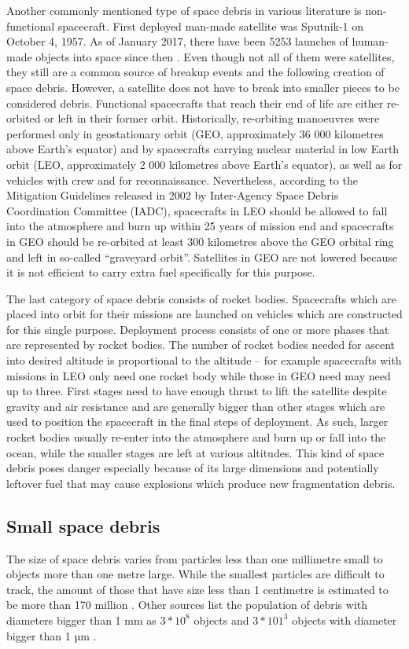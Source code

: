 	Another commonly mentioned type of space debris in various literature is non-functional spacecraft. First deployed man-made satellite was Sputnik-1 on October 4, 1957. As of January 2017, there have been 5253 launches of human-made objects into space since then \citep{esabr336}. Even though not all of them were satellites, they still are a common source of breakup events and the following creation of space debris. However, a satellite does not have to break into smaller pieces to be considered debris. Functional spacecrafts that reach their end of life are either re-orbited or left in their former orbit. Historically, re-orbiting manoeuvres were performed only in geostationary orbit (GEO, approximately 36 000 kilometres above Earth's equator) and by spacecrafts carrying nuclear material in low Earth orbit (LEO, approximately 2 000 kilometres above Earth's equator), as well as for vehicles with crew and for reconnaissance. Nevertheless, according to the Mitigation Guidelines released in 2002 by Inter-Agency Space Debris Coordination Committee (IADC), spacecrafts in LEO should be allowed to fall into the atmosphere and burn up within 25 years of mission end and spacecrafts in GEO should be re-orbited at least 300 kilometres above the GEO orbital ring and left in so-called “graveyard orbit”. Satellites in GEO are not lowered because it is not efficient to carry extra fuel specifically for this purpose.
	
	The last category of space debris consists of rocket bodies. Spacecrafts which are placed into orbit for their missions are launched on vehicles which are constructed for this single purpose. Deployment process consists of one or more phases that are represented by rocket bodies. The number of rocket bodies needed for ascent into desired altitude is proportional to the altitude – for example spacecrafts with missions in LEO only need one rocket body while those in GEO need may need up to three. First stages need to have enough thrust to lift the satellite despite gravity and air resistance and are generally bigger than other stages which are used to position the spacecraft in the final steps of deployment. As such, larger rocket bodies usually re-enter into the atmosphere and burn up or fall into the ocean, while the smaller stages are left at various altitudes. This kind of space debris poses danger especially because of its large dimensions and potentially leftover fuel that may cause explosions which produce new fragmentation debris.
	
\subsection{Small space debris}\label{subsec:small_space_debris}
The size of space debris varies from particles less than one millimetre small to objects more than one metre large. While the smallest particles are difficult to track, the amount of those that have size less than 1 centimetre is estimated to be more than 170 million \citep{esabr336}. Other sources list the population of debris with diameters bigger than 1 mm as $3*10^8$ objects and $3*101^3$ objects with diameter bigger than 1 µm \citep{klinkrad2006space}. 

